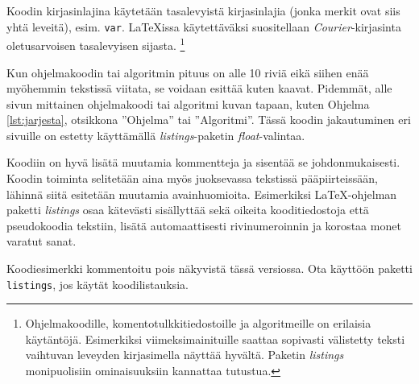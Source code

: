 \documentclass[globalnumbering,centeredcaptions,draftfooter]{tutthesis/tutthesis} %
\begin{document}
Koodin kirjasinlajina käytetään tasalevyistä kirjasinlajia (jonka merkit ovat siis yhtä leveitä), esim. \texttt{var}.
LaTeXissa käytettäväksi suositellaan \emph{Courier}-kirjasinta oletusarvoisen tasalevyisen sijasta.
\footnote{Ohjelmakoodille, komentotulkkitiedostoille ja algoritmeille on erilaisia käytäntöjä.
  Esimerkiksi viimeksimainituille saattaa sopivasti välistetty teksti vaihtuvan leveyden kirjasimella näyttää hyvältä.
  Paketin \emph{listings} monipuolisiin ominaisuuksiin kannattaa tutustua.}

Kun ohjelmakoodin tai algoritmin pituus on alle 10 riviä eikä siihen enää myöhemmin tekstissä viitata, se voidaan esittää kuten kaavat.
Pidemmät, alle sivun mittainen ohjelmakoodi tai algoritmi kuvan tapaan, kuten Ohjelma \ref{lst:jarjesta}, otsikkona ''Ohjelma'' tai ''Algoritmi''.
Tässä koodin jakautuminen eri sivuille on estetty käyttämällä \emph{listings}-paketin \emph{float}-valintaa.

Koodiin on hyvä lisätä muutamia kommentteja ja sisentää se johdonmukaisesti.
Koodin toiminta selitetään aina myös juoksevassa tekstissä pääpiirteissään, lähinnä siitä esitetään muutamia avainhuomioita.
Esimerkiksi LaTeX-ohjelman paketti \emph{listings} \citep{Heinz2006, Oetiker2011} osaa kätevästi sisällyttää sekä oikeita kooditiedostoja että pseudokoodia tekstiin, lisätä automaattisesti rivinumeroinnin ja korostaa monet varatut sanat.


\iffalse %
\begin{lstlisting}[float,caption={Esimerkki ohjelmakoodin esittämisestä kuvan tapaan.},label={lst:jarjesta},language=C]
void jarjesta( Kirjainpari taulukko[], int koko )
{
  // Jarjestetaan taulukko siten, etta jokaisella kierroksella
  // valitaan alkio, joka kuuluu taulukon ensimmaiseksi ja siirretaan
  // se oikealle paikalleen.
  for( int i = 0; i < koko; ++i )
  {
    // Etsitaan pienin eli lahinna aakkosten alkua oleva
    // kirjan lopputaulukosta
    int pienimmanKohta = i;
    for( int j = i; j < koko; ++j )
    {
      if( taulukko[ j ].korvattava
          < taulukko[ pienimmanKohta ].korvattava )
      {
        pienimmanKohta = j;
      }
    }
    // Vaihdetaan pienin alkio omalle paikalleen
    Kirjainpari tmp            = taulukko[ i ];
    taulukko[ i ]              = taulukko[ pienimmanKohta ];
    taulukko[ pienimmanKohta ] = tmp;
  }
  return;
}
\end{lstlisting}
\else
\label{lst:jarjesta}
Koodiesimerkki kommentoitu pois näkyvistä tässä versiossa. Ota käyttöön paketti \texttt{listings}, jos käytät koodilistauksia.
\fi
\end{document}
